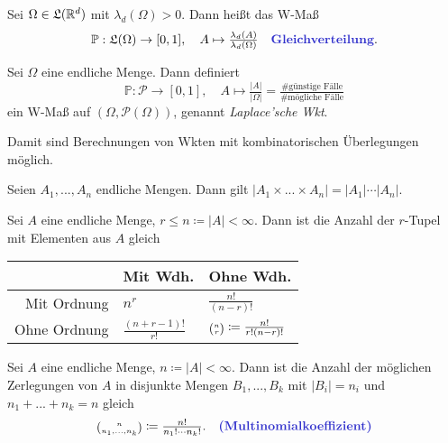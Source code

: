 \documentclass{cheat-sheet}
\newcommand{\LebAlg}{\mathfrak{L}} %
\renewcommand{\P}{\mathbb{P}} %
\let\myBinom\binom
\renewcommand{\binom}[2]{\mathsmaller{\myBinom{#1}{#2}}}
\begin{document}

\begin{defn}
  Sei $\Omega \in \LebAlg(\R^d)$ mit $\lambda_d(\Omega) > 0$. Dann heißt das W-Maß
  \[ \P : \LebAlg(\Omega) \to [0, 1], \quad A \mapsto \tfrac{\lambda_d(A)}{\lambda_d(\Omega)} \quad \text{\emph{Gleichverteilung}.} \]
\end{defn}

\begin{defn}
  Sei $\Omega$ eine endliche Menge. Dann definiert
  \[ \P : \mathcal{P} \to [0, 1], \quad A \mapsto \tfrac{|A|}{|\Omega|} = \tfrac{\text{\# günstige Fälle}}{\text{\# mögliche Fälle}} \]
  ein W-Maß auf $(\Omega, \mathcal{P}(\Omega))$, genannt \emph{Laplace'sche Wkt}.
\end{defn}

\begin{bem}
  Damit sind Berechnungen von Wkten mit kombinatorischen Überlegungen möglich.
\end{bem}


\begin{lem}
  Seien $A_1, ..., A_n$ endliche Mengen. Dann gilt $| A_1 \times ... \times A_n | = |A_1| \cdots |A_n|$.
\end{lem}

\begin{lem}
  Sei $A$ eine endliche Menge, $r \leq n \coloneqq |A| < \infty$. Dann ist die Anzahl der $r$-Tupel mit Elementen aus $A$ gleich

  \begin{center}
    \begin{tabular}{ r | l l }
      & Mit Wdh. & Ohne Wdh. \\ \hline
      Mit Ordnung & $n^r$ & $\tfrac{n!}{(n-r)!}$ \\
      Ohne Ordnung & $\tfrac{(n+r-1)!}{r!}$ & $\binom{n}{r} \coloneqq \tfrac{n!}{r!(n-r)!}$
    \end{tabular}
  \end{center}
\end{lem}



\begin{lem}
  Sei $A$ eine endliche Menge, $n \coloneqq |A| < \infty$. Dann ist die Anzahl der möglichen Zerlegungen von $A$ in disjunkte Mengen $B_1, ..., B_k$ mit $|B_i| = n_i$ und $n_1 + ... + n_k = n$ gleich
  \[
    \binom{n}{n_1, ..., n_k} \coloneqq \tfrac{n!}{n_1! \cdots n_k!}. \quad \text{\emph{(Multinomialkoeffizient)}}
  \]
\end{lem}
\end{document}
